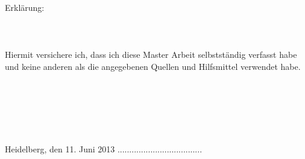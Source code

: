 \newpage
Erkl\"arung:
\\
\\
\\
\\
Hiermit versichere ich, dass ich diese Master Arbeit selbstst\"andig verfasst habe und keine anderen als die angegebenen Quellen und Hilfsmittel verwendet habe.\\
\\
\\
\\
\\
\\
\\
Heidelberg, den 11. Juni 2013            ....................................